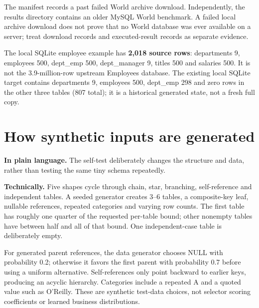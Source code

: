 \documentclass[11pt,a4paper,oneside]{report}
\newcommand{\plain}[1]{\par\textbf{In plain language.} #1\par}
\newcommand{\technical}[1]{\par\textbf{Technically.} #1\par}
\begin{document}
The manifest records a past failed World archive download. Independently, the results directory contains an older MySQL World benchmark. A failed local archive download does not prove that no World database was ever available on a server; treat download records and executed-result records as separate evidence.

The local SQLite employee example has \textbf{2,018 source rows}: departments 9, employees 500, dept\_emp 500, dept\_manager 9, titles 500 and salaries 500. It is not the 3.9-million-row upstream Employees database. The existing local SQLite target contains departments 9, employees 500, dept\_emp 298 and zero rows in the other three tables (807 total); it is a historical generated state, not a fresh full copy.

\section{How synthetic inputs are generated}
\plain{The self-test deliberately changes the structure and data, rather than testing the same tiny schema repeatedly.}
\technical{Five shapes cycle through chain, star, branching, self-reference and independent tables. A seeded generator creates 3--6 tables, a composite-key leaf, nullable references, repeated categories and varying row counts. The first table has roughly one quarter of the requested per-table bound; other nonempty tables have between half and all of that bound. One independent-case table is deliberately empty.}
For generated parent references, the data generator chooses NULL with probability 0.2; otherwise it favors the first parent with probability 0.7 before using a uniform alternative. Self-references only point backward to earlier keys, producing an acyclic hierarchy. Categories include a repeated A and a quoted value such as O'Reilly. These are synthetic test-data choices, not selector scoring coefficients or learned business distributions.
\end{document}
